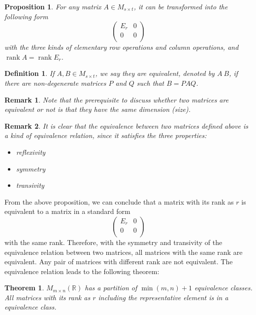 \documentclass[onecolumn]{ctexart}
\newtheorem{definition}{Definition}
\newtheorem{theorem}{Theorem}
\newtheorem{proposition}{Proposition}
\newtheorem{remark}{Remark}
\DeclareMathOperator{\rank}{rank}
\begin{document}
\begin{proposition}
  For any matrix $A \in M_{s \times t}$, it can be transformed into the 
  following form
  \begin{equation}
    \begin{pmatrix}
      E_r & 0 \\
      0 & 0 \\
    \end{pmatrix}
  \end{equation}
  with the three kinds of elementary row operations and column operations, and 
  $\rank A = \rank E_r$.
\end{proposition}

\begin{definition}
  If $A, B \in M_{s \times t}$, we say they are equivalent, denoted by $A ~ B$, 
  if there are non-degenerate matrices $P$ and $Q$ such that $B = PAQ$.
\end{definition}
\begin{remark}
  Note that the prerequisite to discuss whether two matrices are equivalent or 
  not is that they have the same dimension (size).
\end{remark}
\begin{remark}
  It is clear that the equivalence between two matrices defined above is a kind 
  of equivalence relation, since it satisfies the three properties:
  \begin{itemize}
    \item reflexivity
    \item symmetry
    \item transivity
  \end{itemize}
\end{remark}

From the above proposition, we can conclude that a matrix with its rank as $r$ 
is equivalent to a matrix in a standard form
\[
  \begin{pmatrix}
    E_r & 0 \\
    0 & 0 \\
  \end{pmatrix}
\]
with the same rank. Therefore, with the symmetry and transivity of the 
equivalence relation between two matrices, all matrices with the same rank are 
equivalent. Any pair of matrices with different rank are not equivalent. The 
equivalence relation leads to the following theorem:
\begin{theorem}
  $M_{m \times n}(\mathbb{R})$ has a partition of $\min(m, n) + 1$ equivalence 
  classes. All matrices with its rank as $r$ including the representative 
  element is in a equivalence class.
\end{theorem}
\end{document}
